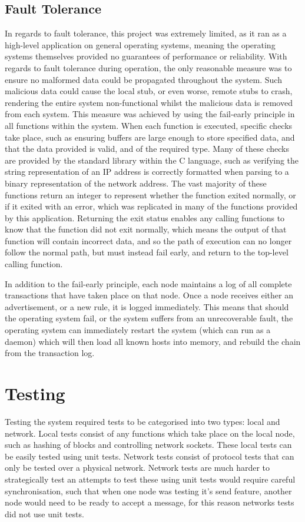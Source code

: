 \documentclass[a4paper, 11pt]{report}
\begin{document}
\section{Fault Tolerance}
In regards to fault tolerance, this project was extremely limited, as it ran as a high-level application on general operating systems, meaning the operating systems themselves provided no guarantees of  performance or reliability. With regards to fault tolerance during operation, the only reasonable measure was to ensure no malformed data could be propagated throughout the system. Such malicious data could cause the local \gls{stub}, or even worse, remote \gls{stub}s to crash, rendering the entire system non-functional whilst the malicious data is removed from each system. This measure was achieved by using the fail-early principle in all functions within the system. When each function is executed, specific checks take place, such as ensuring buffers are large enough to store specified data, and that the data provided is valid, and of the required type. Many of these checks are provided by the standard library within the C language, such as verifying the string representation of an \acrshort{IP} address is  correctly formatted when parsing to a binary representation of the network address. The vast majority of these functions return an integer to represent whether the function exited normally, or if it exited with an error, which was replicated in many of the functions provided by this application. Returning the exit status enables any calling functions to know that the function did not exit normally, which means the output of that function will contain incorrect data, and so the path of execution can no longer follow the normal path, but must instead fail early, and return to the top-level calling function.

In addition to the fail-early principle, each node maintains a log of all complete transactions that have taken place on that node. Once a node receives either an advertisement, or a new rule, it is logged immediately. This means that should the operating system fail, or the system suffers from an unrecoverable fault, the operating system can immediately restart the system (which can run as a daemon) which will then load all known hosts into memory, and rebuild the chain from the transaction log.

\chapter{Testing} \label{test}
Testing the system required tests to be categorised into two types: local and network. Local tests consist of any functions which take place on the local node, such as \gls{hashing} of blocks and controlling network sockets. These local tests can be easily tested using unit tests. Network tests consist of protocol tests that can only be tested over a physical network. Network tests are much harder to strategically test an attempts to test these using unit tests would require careful synchronisation, such that when one node was testing it's send feature, another node would need to be ready to accept a message, for this reason networks tests did not use unit tests.
\end{document}
